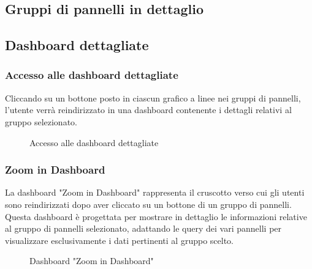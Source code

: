 \subsection{Gruppi di pannelli in dettaglio}




\subsection{Dashboard dettagliate}
\subsubsection{Accesso alle dashboard dettagliate}
Cliccando su un bottone posto in ciascun grafico a linee nei gruppi di pannelli, l'utente verrà reindirizzato in una dashboard contenente i dettagli relativi al gruppo selezionato.
\begin{figure}[H]
    \centering
    \caption{Accesso alle dashboard dettagliate}
    \label{fig:my_label}
\end{figure}

\subsubsection{Zoom in Dashboard}
La dashboard "Zoom in Dashboard" rappresenta il cruscotto verso cui gli utenti sono reindirizzati dopo aver cliccato su un bottone di un gruppo di pannelli. Questa dashboard è progettata per mostrare in dettaglio le informazioni relative al gruppo di pannelli selezionato, adattando le query dei vari pannelli per visualizzare esclusivamente i dati pertinenti al gruppo scelto.
\begin{figure}[H]
    \centering
    \caption{Dashboard "Zoom in Dashboard"}
    \label{fig:my_label}
\end{figure}

